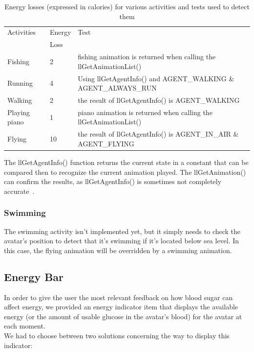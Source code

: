 \begin{table}
\caption{Energy losses (expressed in calories) for various activities and tests used to detect them}
\label{actiTable}
    \begin{tabular}{lll}
    Activities    & Energy & Test\\
                    & Loss  &
\\ \hline
    Fishing       & 2               & fishing animation is returned when calling the llGetAnimationList() \\
    Running       & 4               & Using llGetAgentInfo() and AGENT\_WALKING \& AGENT\_ALWAYS\_RUN  \\
    Walking       & 2               & the result of llGetAgentInfo() is AGENT\_WALKING                     \\
    Playing piano & 1               & piano animation is returned when calling the  llGetAnimationList()  \\
    Flying        & 10              & the result of llGetAgentInfo() is AGENT\_IN\_AIR \& AGENT\_FLYING       \\
    \end{tabular}
\end{table}

The llGetAgentInfo() function returns the current state in a constant that can be compared then to recognize the current animation played. The llGetAnimation() can confirm the results, as llGetAgentInfo() is sometimes not completely accurate~\cite{animDocWebsite}.

\subsubsection{Swimming}
The swimming activity isn't implemented yet, but it simply needs to check the avatar's position to detect that it's swimming if it's located below sea level. In this case, the flying animation will be overridden by a swimming animation. 

\subsection{Energy Bar}
In order to give the user the most relevant feedback on how blood sugar can affect energy, we provided an energy indicator item that displays the available energy (or the amount of usable glucose in the avatar's blood) for the avatar at each moment.\\

We had to choose between two solutions concerning the way to display this indicator:

